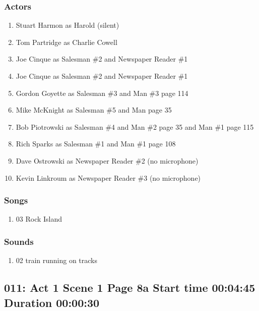 \subsubsection{Actors}
\begin{enumerate}
\item Stuart Harmon as Harold (silent)
\item Tom Partridge as Charlie Cowell
\item Joe Cinque as Salesman \#2 and Newspaper Reader \#1
\item Joe Cinque as Salesman \#2 and Newspaper Reader \#1
\item Gordon Goyette as Salesman \#3 and Man \#3 page 114
\item Mike McKnight as Salesman \#5 and Man page 35
\item Bob Piotrowski as Salesman \#4 and Man \#2 page 35 and Man \#1 page 115
\item Rich Sparks as Salesman \#1 and Man \#1 page 108
\item Dave Ostrowski as Newspaper Reader \#2 (no microphone)
\item Kevin Linkroum as Newspaper Reader \#3 (no microphone)
\end{enumerate}

\subsubsection{Songs}
\begin{enumerate}
\item 03 Rock Island
\end{enumerate}\subsubsection{Sounds}
\begin{enumerate}
\item 02 train running on tracks
\end{enumerate}
\subsection{011: Act 1 Scene 1 Page 8a Start time 00:04:45 Duration 00:00:30}

